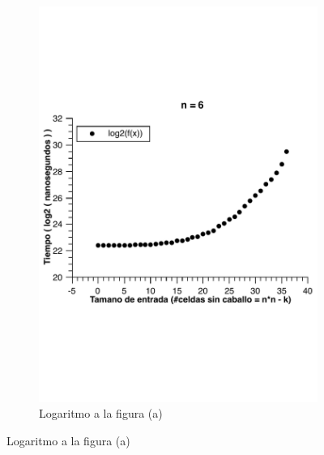 \begin{figure}[H]
\begin{subfigure}[b]{0.5\textwidth}
                \includegraphics[width=\textwidth]{imagenes/grafico3-n-6-log.pdf}
                \caption{Logaritmo a la figura (a)}
        \end{subfigure}
        

\end{figure}
